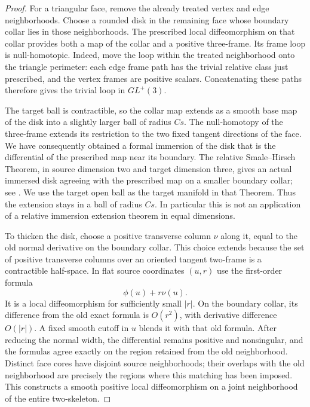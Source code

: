 \documentclass[11pt]{article}
\numberwithin{equation}{section}
\theoremstyle{definition}
\theoremstyle{remark}
\begin{document}
\begin{proof}
For a triangular face, remove the already treated vertex and edge
neighborhoods.  Choose a rounded disk in the remaining face whose
boundary collar lies in those neighborhoods.  The prescribed local
diffeomorphism on that collar provides both a map of the collar and a
positive three-frame.  Its frame loop is null-homotopic.  Indeed, move
the loop within the treated neighborhood onto the triangle perimeter:
each edge frame path has the trivial relative class just prescribed,
and the vertex frames are positive scalars.  Concatenating these paths
therefore gives the trivial loop in $GL^+(3)$.

The target ball is contractible, so the collar map extends as a smooth
base map of the disk into a slightly larger ball of radius $Cs$.
The null-homotopy of the three-frame extends its restriction to the two
fixed tangent directions of the face.  We have consequently obtained
a formal immersion of the disk that is the differential of the
prescribed map near its boundary.  The relative Smale--Hirsch Theorem,
in source dimension two and target dimension three, gives an actual
immersed disk agreeing with the prescribed map on a smaller boundary
collar; see \cite[Theorem~5.7]{Hirsch1959}.  We use the target open ball
as the target manifold in that Theorem.  Thus the extension stays in
a ball of radius $Cs$.  In particular this is not an application of a
relative immersion extension theorem in equal dimensions.

To thicken the disk, choose a positive transverse column $\nu$ along it,
equal to the old normal derivative on the boundary collar.  This
choice extends because the set of positive transverse columns over
an oriented tangent two-frame is a contractible half-space.  In flat
source coordinates $(u,r)$ use the first-order formula
\[
 \phi(u)+r\nu(u).
\]
It is a local diffeomorphism for sufficiently small $|r|$.  On the
boundary collar, its difference from the old exact formula is
$O(r^2)$, with derivative difference $O(|r|)$.  A fixed smooth cutoff
in $u$ blends it with that old formula.  After reducing the normal
width, the differential remains positive and nonsingular, and the
formulas agree exactly on the region retained from the old
neighborhood.  Distinct face cores have disjoint source neighborhoods;
their overlaps with the old neighborhood are precisely the regions
where this matching has been imposed.  This constructs a smooth
positive local diffeomorphism on a joint neighborhood of the entire
two-skeleton.


\end{proof}
\end{document}
